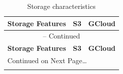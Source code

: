 \begin{longtable}{p{3.7cm}|p{3.7cm}|p{3.7cm}}
\caption{Storage characteristics \label{table:storage_char}}\\

\hline
\hline
{\textbf{Storage Features}} &
{\textbf{S3}} &
{\textbf{GCloud}}\\
\hline
\endfirsthead


\multicolumn{3}{c}{{\tablename} \thetable{} -- Continued} \\[0.5ex]
\hline
\hline
{\textbf{Storage Features}} &
{\textbf{S3}} &
{\textbf{GCloud}}\\
\hline
\endhead

\multicolumn{3}{l}{{Continued on Next Page\ldots}} \\
\endfoot


\hline \hline
\endlastfoot



\end{longtable}
